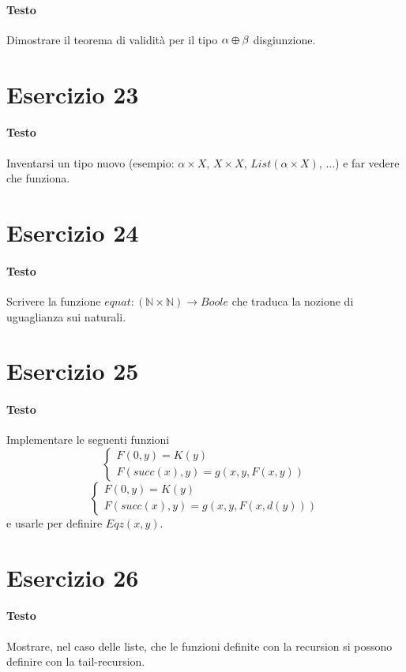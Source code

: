 \documentclass[a4paper,10pt]{article}
\begin{document}
\paragraph{Testo}
Dimostrare il teorema di validità per il tipo $\alpha \varoplus \beta$ disgiunzione.

\section*{Esercizio 23}
\paragraph{Testo}
Inventarsi un tipo nuovo (esempio: $\alpha \times X$, $X \times X$, $List(\alpha \times X)$, $\dots$) e far vedere che funziona.

\section*{Esercizio 24}
\paragraph{Testo}
Scrivere la funzione $eqnat : (\mathbb{N} \times \mathbb{N}) \rightarrow Boole$ che traduca la nozione di uguaglianza sui naturali.

\section*{Esercizio 25}
\paragraph{Testo}
Implementare le seguenti funzioni
$$\begin{cases} F(0,y) = K(y) \\ F(succ(x),y) = g(x,y,F(x,y)) \end{cases}$$
$$\begin{cases} F(0,y) = K(y) \\ F(succ(x),y) = g(x,y,F(x,d(y))) \end{cases}$$
e usarle per definire $Eqz(x,y)$.

\section*{Esercizio 26}
\paragraph{Testo}
Mostrare, nel caso delle liste, che le funzioni definite con la recursion si possono definire con la tail-recursion.
\end{document}
